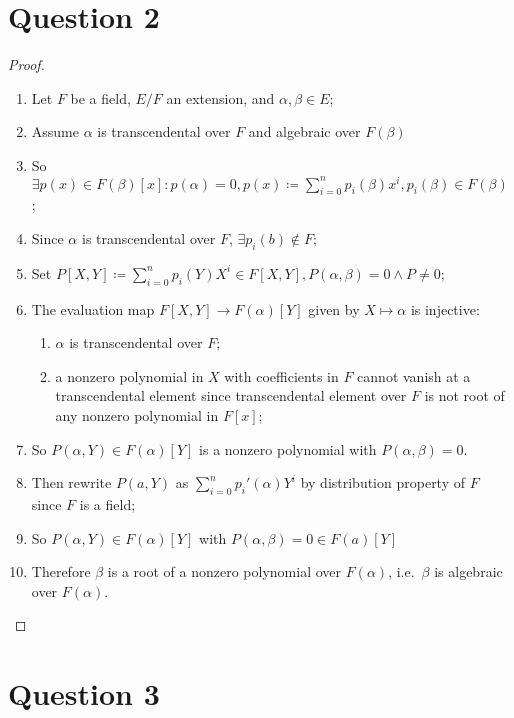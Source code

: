 \documentclass[12pt]{article}
\begin{document}
\section*{Question 2}
\begin{proof}
~
    \begin{enumerate}
\item Let $F$ be a field, $E/F$ an extension, and $\alpha,\beta\in E$;
\item Assume $\alpha$ is transcendental over $F$ and algebraic over $F(\beta)$
\item So $\exists p(x)\in F(\beta)[x]:p(\alpha)=0,p(x)\coloneqq \sum_{i=0}^np_i(\beta)x^i,p_i(\beta)\in F(\beta)$;
\item Since $\alpha$ is transcendental over $F$, $\exists p_i(b)\notin F$;
\item Set $P[X,Y]\coloneqq \sum_{i=0}^n p_i(Y)X^i\in F[X,Y],P(\alpha,\beta)=0\land P\ne 0$;
\item The evaluation map $F[X,Y]\to F(\alpha)[Y]$ given by $X\mapsto\alpha$ is injective:
\begin{enumerate}
\item $\alpha$ is transcendental over $F$;
    \item a nonzero polynomial in $X$ with coefficients in $F$ cannot vanish at a transcendental element since transcendental element over $F$ is not root of any nonzero polynomial in $F[x]$;
\end{enumerate}
\item So $P(\alpha,Y)\in F(\alpha)[Y]$ is a nonzero polynomial with $P(\alpha,\beta)=0$.
\item Then rewrite $P(a,Y)$ as $\sum_{i=0}^n {p_i}'(\alpha)Y^i$ by distribution property of $F$ since $F$ is a field;
\item So $P(\alpha,Y)\in F(\alpha)[Y]$ with $P(\alpha,\beta)=0\in F(a)[Y]$
\item Therefore $\beta$ is a root of a nonzero polynomial over $F(\alpha)$, i.e.\ $\beta$ is algebraic over $F(\alpha)$.
\end{enumerate}
\end{proof}

\newpage

\section*{Question 3}
\end{document}
